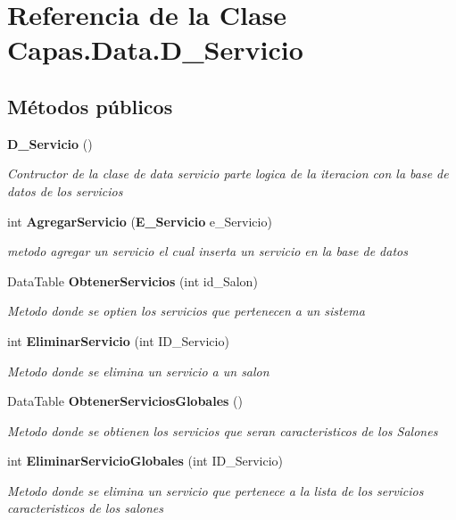 \section{Referencia de la Clase Capas.\+Data.\+D\+\_\+\+Servicio}
\label{class_capas_1_1_data_1_1_d___servicio}
\subsection*{Métodos públicos}
\begin{DoxyCompactItemize}
\item 
{\bf D\+\_\+\+Servicio} ()
\begin{DoxyCompactList}\small\item\em Contructor de la clase de data servicio parte logica de la iteracion con la base de datos de los servicios \end{DoxyCompactList}\item 
int {\bf Agregar\+Servicio} ({\bf E\+\_\+\+Servicio} e\+\_\+\+Servicio)
\begin{DoxyCompactList}\small\item\em metodo agregar un servicio el cual inserta un servicio en la base de datos \end{DoxyCompactList}\item 
Data\+Table {\bf Obtener\+Servicios} (int id\+\_\+\+Salon)
\begin{DoxyCompactList}\small\item\em Metodo donde se optien los servicios que pertenecen a un sistema \end{DoxyCompactList}\item 
int {\bf Eliminar\+Servicio} (int I\+D\+\_\+\+Servicio)
\begin{DoxyCompactList}\small\item\em Metodo donde se elimina un servicio a un salon \end{DoxyCompactList}\item 
Data\+Table {\bf Obtener\+Servicios\+Globales} ()
\begin{DoxyCompactList}\small\item\em Metodo donde se obtienen los servicios que seran caracteristicos de los Salones \end{DoxyCompactList}\item 
int {\bf Eliminar\+Servicio\+Globales} (int I\+D\+\_\+\+Servicio)
\begin{DoxyCompactList}\small\item\em Metodo donde se elimina un servicio que pertenece a la lista de los servicios caracteristicos de los salones \end{DoxyCompactList}\item 

\end{DoxyCompactItemize}
